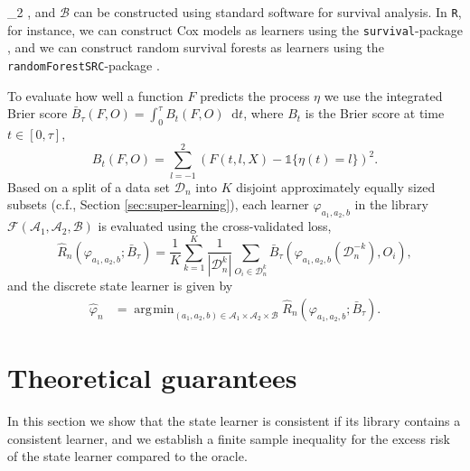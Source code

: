 \documentclass[a4paper,danish]{article}
\theoremstyle{plain} %
\numberwithin{theorem}{section}
\theoremstyle{definition} %
\theoremstyle{remark}
\renewcommand{\phi}{\varphi}
\newcommand*\diff{\mathop{}\!\mathrm{d}}
\newcommand{\1}{\mathds{1}}
\DeclareMathOperator*{\argmin}{\arg\!\min}
\newcommand{\data}{\ensuremath{\mathcal{D}}}
\begin{document}
_2 \), and \( \mathcal{B} \) can be constructed using
standard software for survival analysis. In
\texttt{R}, for instance, we can construct Cox models as
learners using the \texttt{survival}-package
\citep{survival-package}, and we can construct random survival
forests as learners using the \texttt{randomForestSRC}-package \citep{randomForestSRC}.

To evaluate how well a function \( F \) predicts the
process $\eta$ we use the integrated Brier score \citep{graf1999assessment}
\( \bar B_\tau( F,O) = \int_0^{\tau} B_t(F,O) \diff t \),
where \( B_t \) is the Brier score
\citep{brier1950verification} at time \( t \in [0, \tau] \),
\begin{equation*}
  B_t(F,O) = \sum_{l=-1}^{2}
  \left(
      F(t,l,X) - \1{\{\eta(t)=l\}}
  \right)^2.
\end{equation*}
Based on a split of a data set \(\data_n\) into $K$ disjoint
approximately equally sized subsets (c.f., Section
\ref{sec:super-learning}), each learner
\( \phi_{a_1, a_2, b} \) in the library
\( \mathcal{F}(\mathcal{A}_1, \mathcal{A}_2, \mathcal{B}) \)
is evaluated using the cross-validated loss,
\begin{equation*}
  \hat{R}_{n}(\phi_{a_1,a_2,b} ; \bar{B}_{\tau}) =
  \frac{1}{K}\sum_{k=1}^{K}
  \frac{1}{| \data_n^{k} |}\sum_{O_i \in \data_n^{k}}
  \bar B_\tau
  {
    \left(
      \phi_{a_1,a_2,b}{ (\data_n^{-k})}
      , O_i
    \right)
  },
\end{equation*}
and the discrete state learner is given by
\begin{align*}\label{eq:discrete-state-learner}
  \hat{\phi}_n
  &=  \argmin_{(a_1,a_2,b)\in \mathcal{A}_1\times\mathcal{A}_2\times\mathcal{B}}
    \hat{R}_{n}(\phi_{a_1,a_2,b} ; \bar{B}_{\tau}).
\end{align*}




\section{Theoretical guarantees}
\label{sec:theor-results-prop}

In this section we show that the state learner is consistent if its
library contains a consistent learner, and we establish a finite
sample inequality for the excess risk of the state learner compared to
the oracle.
\end{document}
